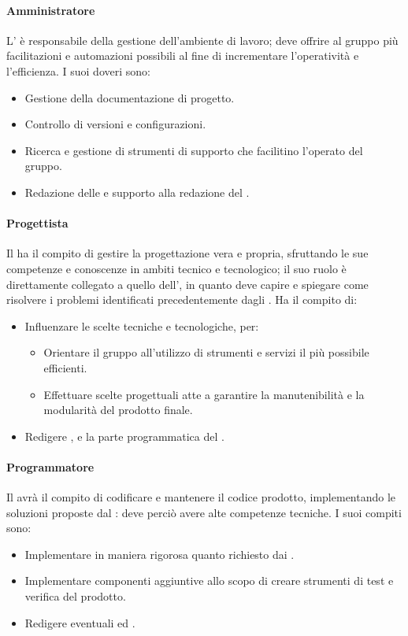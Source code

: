 \paragraph{Amministratore}
L'\adm{} è responsabile della gestione dell'ambiente di lavoro; deve offrire al gruppo più facilitazioni e automazioni possibili al fine di incrementare l'operatività e l'efficienza. I suoi doveri sono:
\begin{itemize}
\item Gestione della documentazione di progetto.
\item Controllo di versioni e configurazioni.
\item Ricerca e gestione di strumenti di supporto che facilitino l'operato del gruppo.
\item Redazione delle \NdP{} e supporto alla redazione del \PdP{}.
\end{itemize}

\paragraph{Progettista}
Il \prog{} ha il compito di gestire la progettazione vera e propria, sfruttando le sue competenze e conoscenze in ambiti tecnico e tecnologico; il suo ruolo è direttamente collegato a quello dell'\ana, in quanto deve capire e spiegare come risolvere i problemi identificati precedentemente dagli \anas. Ha il compito di:
\begin{itemize}
\item Influenzare le scelte tecniche e tecnologiche, per:
\begin{itemize}
\item Orientare il gruppo all'utilizzo di strumenti e servizi il più possibile efficienti. 
\item Effettuare scelte progettuali atte a garantire la manutenibilità e la modularità del prodotto finale.
\end{itemize} 
\item Redigere \ST{}, \DdP{} e la parte programmatica del \PdQ{}.
\end{itemize}

\paragraph{Programmatore}
Il \progr{} avrà il compito di codificare e mantenere il codice prodotto, implementando le soluzioni proposte dal \prog{}: deve perciò avere alte competenze tecniche. I suoi compiti sono:
\begin{itemize}
\item Implementare in maniera rigorosa quanto richiesto dai \progs{}.
\item Implementare componenti aggiuntive allo scopo di creare strumenti di test e verifica del prodotto.
\item Redigere eventuali \MU{} ed \MM{}.
\end{itemize}

